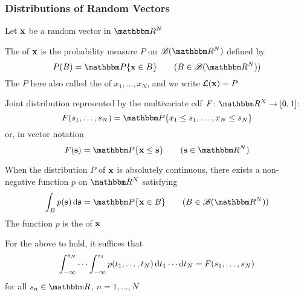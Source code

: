 \begin{frame}\frametitle{Distributions of Random Vectors}
    
    \vspace{2em}
    Let ${\mathbf x}$ be a random vector in $\RR^N$
    
    \vspace{1em}
    The  of
    ${\mathbf x}$ is the probability measure $P$ on $\bB(\RR^N)$ defined by
    \begin{equation*}
        \label{eq:dmnu}
        P(B) = \PP\{\boldx \in B\}
        \qquad (B \in \bB(\RR^N))
    \end{equation*}
    The $P$ here also called the  of
    $x_1,\ldots, x_N$, and we write $\mathcal L({\mathbf x}) = P$
    
\end{frame}
    
\begin{frame}
    
    \vspace{2em}
    Joint distribution represented by the multivariate {\sc cdf} $F \colon \RR^N \to [0, 1]$:
    $$F(s_1,\ldots,s_N) = \PP\{ x_1 \leq s_1, \ldots, x_N \leq s_N\}$$
    or, in vector notation
    \begin{equation*}
        F(\bolds) = \PP\{\boldx \leq \bolds\}
        \qquad (\bolds \in \RR^N)
    \end{equation*}
    
\end{frame}

\begin{frame}

    \vspace{2em}
    When the distribution $P$ of ${\mathbf x}$
    is absolutely continuous, there exists a non-negative function $p$ on $\RR^N$
    satisfying 
    \begin{equation*}
        \label{eq:defjd00}
        \int_B p(\bolds) \diff  \bolds = \PP\{\boldx \in B\}
        \qquad (B \in \bB(\RR^N))
    \end{equation*}
    The function $p$ is the  of
    ${\mathbf x}$
    
    \vspace{1em}
    For the above to hold, it suffices that 
    \begin{equation*}
    \label{eq:defjd}
    \int_{-\infty}^{s_N} 
    \cdots
     \int_{-\infty}^{s_1} 
    p(t_1,\ldots,t_N) 
    \mathop{}\!\mathrm{d} t_1 \cdots \mathop{}\!\mathrm{d} t_N
    = F(s_1,\ldots,s_N) 
    \end{equation*}
    for all $s_n  \in \RR$, $n=1,\ldots, N$ 
    
\end{frame}



